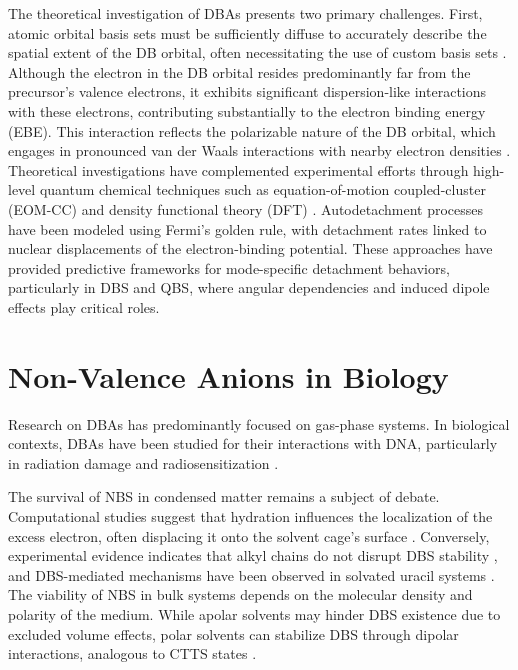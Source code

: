 The theoretical investigation of DBAs presents two primary challenges. First, atomic orbital basis sets must be sufficiently diffuse to accurately describe the spatial extent of the DB orbital, often necessitating the use of custom basis sets \cite{skurski2000choose}. Although the electron in the DB orbital resides predominantly far from the precursor's valence electrons, it exhibits significant dispersion-like interactions with these electrons, contributing substantially to the electron binding energy (EBE). This interaction reflects the polarizable nature of the DB orbital, which engages in pronounced van der Waals interactions with nearby electron densities \cite{gutowski1996contribution}.
Theoretical investigations have complemented experimental efforts through high-level quantum chemical techniques such as equation-of-motion coupled-cluster (EOM-CC) and density functional theory (DFT) \cite{thiam2023accurately}. Autodetachment processes have been modeled using Fermi's golden rule, with detachment rates linked to nuclear displacements of the electron-binding potential. These approaches have provided predictive frameworks for mode-specific detachment behaviors, particularly in DBS and QBS, where angular dependencies and induced dipole effects play critical roles.

\section{Non-Valence Anions in Biology}
Research on DBAs has predominantly focused on gas-phase systems. In biological contexts, DBAs have been studied for their interactions with DNA, particularly in radiation damage and radiosensitization \cite{narayanan2023secondary,sedmidubska2024interaction}. 

The survival of NBS in condensed matter remains a subject of debate. Computational studies suggest that hydration influences the localization of the excess electron, often displacing it onto the solvent cage's surface \cite{anusiewicz2020fate}. Conversely, experimental evidence indicates that alkyl chains do not disrupt DBS stability \cite{castellani2019stability}, and DBS-mediated mechanisms have been observed in solvated uracil systems \cite{narayanan2024electron}. The viability of NBS in bulk systems depends on the molecular density and polarity of the medium. While apolar solvents may hinder DBS existence due to excluded volume effects, polar solvents can stabilize DBS through dipolar interactions, analogous to CTTS states \cite{bradforth2002excited,chen2000precursors}.

